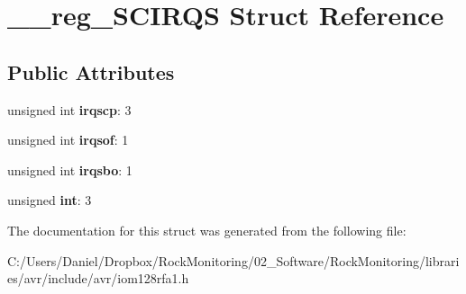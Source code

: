 \hypertarget{struct____reg___s_c_i_r_q_s}{}\section{\+\_\+\+\_\+reg\+\_\+\+S\+C\+I\+R\+QS Struct Reference}
\label{struct____reg___s_c_i_r_q_s}
\subsection*{Public Attributes}
\begin{DoxyCompactItemize}
\item 
unsigned int {\bfseries irqscp}\+: 3\hypertarget{struct____reg___s_c_i_r_q_s_ae4b0902065e25ed83d15e8a5d820d77d}{}\label{struct____reg___s_c_i_r_q_s_ae4b0902065e25ed83d15e8a5d820d77d}

\item 
unsigned int {\bfseries irqsof}\+: 1\hypertarget{struct____reg___s_c_i_r_q_s_a0a1ad4505b68e08c553a48547926d11b}{}\label{struct____reg___s_c_i_r_q_s_a0a1ad4505b68e08c553a48547926d11b}

\item 
unsigned int {\bfseries irqsbo}\+: 1\hypertarget{struct____reg___s_c_i_r_q_s_afbcf28d3c1f4bd6987b6664dcbfe5766}{}\label{struct____reg___s_c_i_r_q_s_afbcf28d3c1f4bd6987b6664dcbfe5766}

\item 
unsigned {\bfseries int}\+: 3\hypertarget{struct____reg___s_c_i_r_q_s_acd6822f8dba228e67d1b21ad146b7d22}{}\label{struct____reg___s_c_i_r_q_s_acd6822f8dba228e67d1b21ad146b7d22}

\end{DoxyCompactItemize}


The documentation for this struct was generated from the following file\+:\begin{DoxyCompactItemize}
\item 
C\+:/\+Users/\+Daniel/\+Dropbox/\+Rock\+Monitoring/02\+\_\+\+Software/\+Rock\+Monitoring/libraries/avr/include/avr/iom128rfa1.\+h\end{DoxyCompactItemize}
